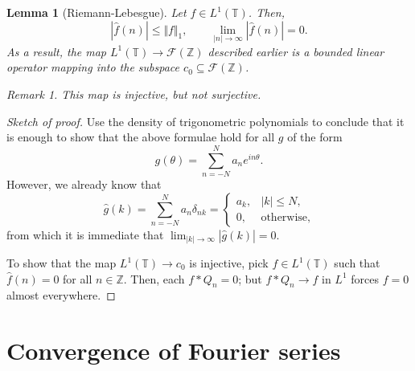 \documentclass[11pt]{article}
\newtheorem*{lemma}{Lemma}
\theoremstyle{definition}
\theoremstyle{remark}
\newtheorem*{remark}{Remark}
\begin{document}
    \begin{lemma}[Riemann-Lebesgue]
        Let $f \in L^1(\mathbb{T})$. Then, \[
            |\hat{f}(n)| \leq \Vert f\Vert_1, \qquad
            \lim_{|n| \to \infty} |\hat{f}(n)| = 0.
        \] As a result, the map $L^1(\mathbb{T}) \to \mathscr{F}(\mathbb{Z})$
        described earlier is a bounded linear operator mapping into the subspace
        $c_0 \subseteq \mathscr{F}(\mathbb{Z})$.
        \begin{remark}
            This map is injective, but not surjective.
        \end{remark}
    \end{lemma}
    \begin{proof}[Sketch of proof]
        Use the density of trigonometric polynomials to conclude that it is enough to
        show that the above formulae hold for all $g$ of the form \[
            g(\theta) = \sum_{n = -N}^N a_n e^{in\theta}.
        \] However, we already know that \[
            \hat{g}(k) = \sum_{n = -N}^N a_n\delta_{nk} = \begin{cases}
                a_k, & |k| \leq N, \\
                0, & \text{otherwise},
            \end{cases}
        \] from which it is immediate that $\lim_{|k| \to \infty} |\hat{g}(k)| = 0$.

        To show that the map $L^1(\mathbb{T}) \to c_0$ is injective, pick $f \in
        L^1(\mathbb{T})$ such that $\hat{f}(n) = 0$ for all $n \in \mathbb{Z}$. Then,
        each $f * Q_n = 0$; but $f * Q_n \to f$ in $L^1$ forces $f = 0$ almost
        everywhere.
    \end{proof}


    \section*{Convergence of Fourier series}
\end{document}
